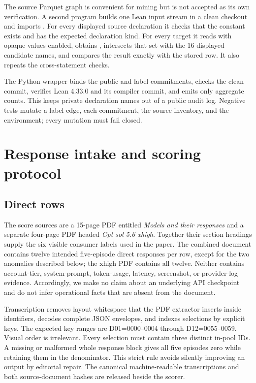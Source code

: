 The source Parquet graph is convenient for mining but is not accepted as its
own verification.  A second program builds one Lean input stream in a clean
\mathlib{} checkout and imports .  For every displayed source
declaration it checks that the constant exists and has the expected declaration
kind.  For every target it reads  with opaque values
enabled, obtains , intersects that set with the
16 displayed candidate names, and compares the result exactly with the stored
row.  It also repeats the cross-statement  checks.

The Python wrapper binds the public and label commitments, checks the clean
\mathlib{} commit, verifies Lean 4.33.0 and its compiler commit, and emits only
aggregate counts.  This keeps private declaration names out of a public audit
log.  Negative tests mutate a label edge, each commitment, the source
inventory, and the environment; every mutation must fail closed.



\section{Response intake and scoring protocol}

\subsection{Direct rows}

The score sources are a 15-page PDF entitled \emph{Models and their responses}
and a separate four-page PDF headed \emph{Gpt sol 5.6 xhigh}.  Together their
section headings supply the six visible consumer labels used in the paper.  The
combined document contains twelve intended five-episode direct responses per
row, except for the two anomalies described below; the xhigh PDF contains all
twelve.  Neither contains account-tier, system-prompt, token-usage, latency,
screenshot, or provider-log evidence.
Accordingly, we make no claim about an underlying API checkpoint and do not
infer operational facts that are absent from the document.

Transcription removes layout whitespace that the PDF extractor inserts inside
identifiers, decodes complete JSON envelopes, and indexes selections by explicit
 keys.  The expected key ranges are D01=0000--0004 through
D12=0055--0059.  Visual order is irrelevant.  Every selection must contain
three distinct in-pool IDs.  A missing or malformed whole response block gives
all five episodes zero while retaining them in the denominator.  This strict
rule avoids silently improving an output by editorial repair.  The canonical
machine-readable transcriptions and both source-document hashes are released beside
the scorer.

